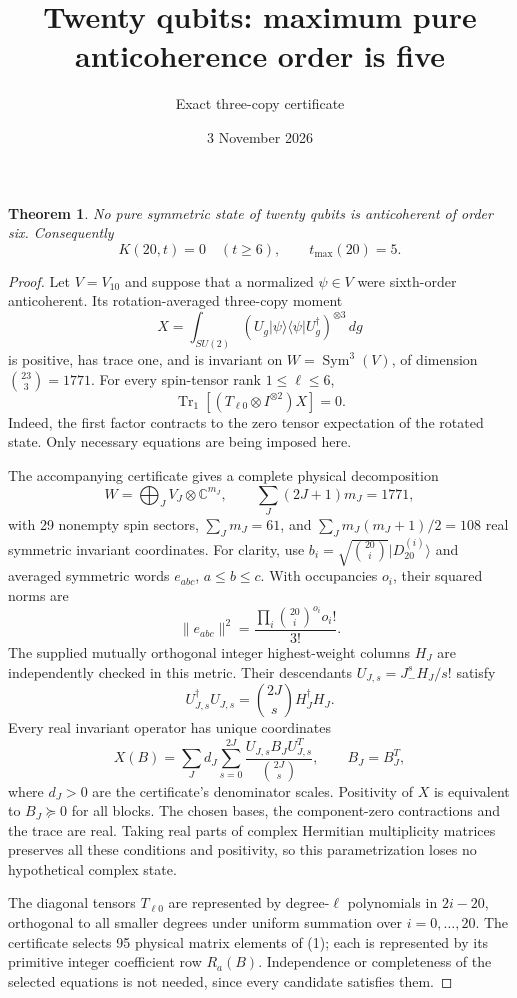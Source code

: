 \documentclass[11pt]{article}
\newtheorem{theorem}{Theorem}
\newcommand{\Tr}{\operatorname{Tr}}
\begin{document}
\title{Twenty qubits: maximum pure anticoherence order is five}
\author{Exact three-copy certificate}
\date{3 November 2026}
\maketitle
\begin{theorem}
No pure symmetric state of twenty qubits is anticoherent of order six.
Consequently
\[
 \boxed{K(20,t)=0\quad(t\ge6),\qquad t_{\max}(20)=5.}
\]
\end{theorem}
\begin{proof}
Let $V=V_{10}$ and suppose that a normalized $\psi\in V$ were sixth-order
anticoherent. Its rotation-averaged three-copy moment
\[
 X=\int_{SU(2)}(U_g|\psi\rangle\langle\psi|U_g^\dagger)^{\otimes3}\,dg
\]
is positive, has trace one, and is invariant on
$W=\operatorname{Sym}^3(V)$, of dimension $\binom{23}{3}=1771$.
For every spin-tensor rank $1\le\ell\le6$,
\[
 \Tr_1[(T_{\ell0}\otimes I^{\otimes2})X]=0. \tag{1}
\]
Indeed, the first factor contracts to the zero tensor expectation of the
rotated state. Only necessary equations are being imposed here.

The accompanying certificate gives a complete physical decomposition
\[
 W=\bigoplus_J V_J\otimes\mathbb C^{m_J},\qquad
 \sum_J(2J+1)m_J=1771,
\]
with 29 nonempty spin sectors, $\sum_Jm_J=61$, and
$\sum_Jm_J(m_J+1)/2=108$ real symmetric invariant coordinates.
For clarity, use $b_i=\sqrt{\binom{20}{i}}|D_{20}^{(i)}\rangle$
and averaged symmetric words $e_{abc}$, $a\le b\le c$. With occupancies
$o_i$, their squared norms are
\[
 \|e_{abc}\|^2=\frac{\prod_i\binom{20}{i}^{o_i}o_i!}{3!}.
\]
The supplied mutually orthogonal integer highest-weight columns $H_J$
are independently checked in this metric. Their descendants
$U_{J,s}=J_-^sH_J/s!$ satisfy
\[
 U_{J,s}^\dagger U_{J,s}=\binom{2J}{s}H_J^\dagger H_J.
\]
Every real invariant operator has unique coordinates
\[
 X(B)=\sum_J d_J\sum_{s=0}^{2J}
 \frac{U_{J,s}B_JU_{J,s}^T}{\binom{2J}{s}},\qquad B_J=B_J^T,
\]
where $d_J>0$ are the certificate's denominator scales. Positivity of $X$
is equivalent to $B_J\succeq0$ for all blocks. The chosen bases, the
component-zero contractions and the trace are real. Taking real parts of
complex Hermitian multiplicity matrices preserves all these conditions
and positivity, so this parametrization loses no hypothetical complex
state.

The diagonal tensors $T_{\ell0}$ are represented by degree-$\ell$
polynomials in $2i-20$, orthogonal to all smaller degrees under uniform
summation over $i=0,\ldots,20$. The certificate selects 95 physical matrix
elements of (1); each is represented by its primitive integer coefficient
row $R_a(B)$. Independence or completeness of the selected equations is
not needed, since every candidate satisfies them.


\end{proof}
\end{document}
